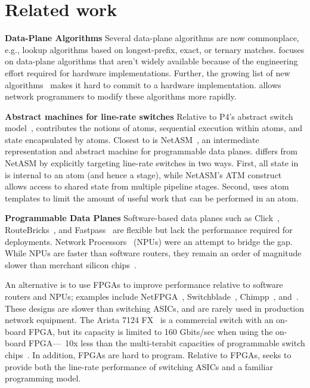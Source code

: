 \section{Related work}
\label{s:related}
\textbf{Data-Plane Algorithms}
Several data-plane algorithms are now commonplace, e.g., lookup algorithms based
on longest-prefix, exact, or ternary matches.  \pktlanguage focuses on
data-plane algorithms that aren't widely available because of the engineering
effort required for hardware implementations.  Further, the growing list of new
algorithms~\cite{pdq, d3, detail, codel, conga} makes it hard to commit to a
hardware implementation. \pktlanguage allows network programmers to modify
these algorithms more rapidly.

\textbf{Abstract machines for line-rate switches}
Relative to P4's abstract switch model~\cite{p4}, \absmachine contributes the
notions of atoms, sequential execution within atoms, and state encapsulated by
atoms. Closest to \absmachine is NetASM~\cite{netasm}, an intermediate
representation and abstract machine for programmable data planes.  \absmachine
differs from NetASM by explicitly targeting line-rate switches in two ways.
First, all state in \absmachine is internal to an atom (and hence a stage),
while NetASM's ATM construct allows access to shared state from multiple
pipeline stages. Second, \absmachine uses atom templates to limit the amount of
useful work that can be performed in an atom.

\textbf{Programmable Data Planes}
Software-based data planes such as Click~\cite{click},
RouteBricks~\cite{routebricks}, and Fastpass~\cite{fastpass} are flexible but
lack the performance required for deployments. Network
Processors~\cite{ixp2800, ixp4xx} (NPUs) were an attempt to bridge the gap.
While NPUs are faster than software routers, they remain an order of magnitude
slower than merchant silicon chips~\cite{rmt}.

An alternative is to use FPGAs to improve performance relative to software
routers and NPUs; examples include NetFPGA~\cite{netfpga},
Switchblade~\cite{switchblade}, Chimpp~\cite{chimpp}, and~\cite{silver_bullet}.
These designs are slower than switching ASICs, and are rarely used in
production network equipment. The Arista 7124 FX~\cite{7124fx} is a commercial
switch with an on-board FPGA, but its capacity is limited to 160 Gbits/sec when
using the on-board FPGA---~10x less than the multi-terabit capacities of
programmable switch chips~\cite{xpliant}. In addition, FPGAs are hard to
program. Relative to FPGAs, \pktlanguage seeks to provide both the line-rate
performance of switching ASICs and a familiar programming model.

